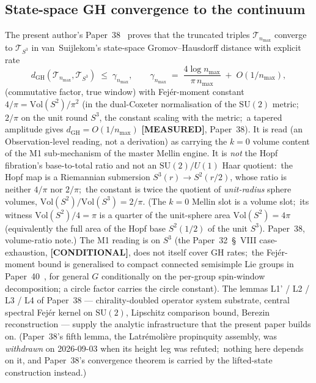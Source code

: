 \documentclass[11pt,a4paper]{article}
\theoremstyle{plain}
\theoremstyle{definition}
\newcommand{\nmax}{n_{\max}}
\newcommand{\sthree}{S^{3}}
\newcommand{\Tcal}{\mathcal{T}}
\newcommand{\SU}{\mathrm{SU}}
\newcommand{\Vol}{\mathrm{Vol}}
\begin{document}
\subsection{State-space GH convergence to the continuum}
\label{sec:propinquity_recap}

The present author's Paper~38~\cite{paper38} proves that the
truncated triples $\Tcal_{\nmax}$ converge to $\Tcal_{\sthree}$ in
van~Suijlekom's state-space Gromov--Hausdorff
distance with explicit rate
\begin{equation}\label{eq:paper38_main}
   d_{\mathrm{GH}}(\Tcal_{\nmax}, \Tcal_{\sthree})
   \;\le\; \gamma_{\nmax},
   \qquad
   \gamma_{\nmax} \;=\; \frac{4 \log \nmax}{\pi \, \nmax}
                       \;+\; O(1/\nmax),
\end{equation}
(commutative factor, true window) with Fej\'er-moment
constant $4/\pi = \Vol(S^2)/\pi^2$ (in the dual-Coxeter normalisation
of the $\SU(2)$ metric;\ $2/\pi$ on the unit round $\sthree$, the
constant scaling with the metric;\ a tapered amplitude gives
$d_{\mathrm{GH}} = O(1/\nmax)$ \textbf{[MEASURED]}, Paper~38). It is read (an Observation-level
reading, not a derivation) as carrying the $k = 0$ volume content of the M1
sub-mechanism of the master Mellin engine.  It is
\emph{not} the Hopf fibration's base-to-total ratio and not an
$\SU(2)/U(1)$ Haar quotient:\ the Hopf map is a Riemannian submersion
$S^3(r) \to S^2(r/2)$, whose ratio is neither $4/\pi$ nor $2/\pi$;\ the
constant is twice the quotient of \emph{unit-radius} sphere volumes,
$\Vol(S^2)/\Vol(\sthree) = 2/\pi$.  (The $k = 0$ Mellin slot is a volume slot;\ its witness
$\Vol(S^2)/4 = \pi$ is a quarter of the unit-sphere area $\Vol(S^2) = 4\pi$ (equivalently the full area of the Hopf base $S^2(1/2)$ of the unit $S^3$).  Paper~38, volume-ratio note.)
The M1 reading is on $\sthree$ (the Paper~32~\S~VIII case-exhaustion,
\textbf{[CONDITIONAL]}, does not itself cover GH rates;\ the Fej\'er-moment bound is
generalised to compact connected semisimple Lie groups in
Paper~40~\cite{paper40_unified}, for general $G$ conditionally on the
per-group spin-window decomposition; a circle factor carries the circle constant). The lemmas L1' / L2 / L3 / L4
of Paper~38 — chirality-doubled operator system substrate, central
spectral Fej\'er kernel on $\SU(2)$, Lipschitz comparison bound,
Berezin reconstruction — supply the analytic infrastructure that the
present paper builds on.  (Paper~38's fifth lemma, the
Latr\'emoli\`ere propinquity assembly, was \emph{withdrawn} on
2026-09-03 when its height leg was refuted;\ nothing here depends on
it, and Paper~38's convergence theorem is carried by the
lifted-state construction instead.)
\end{document}
